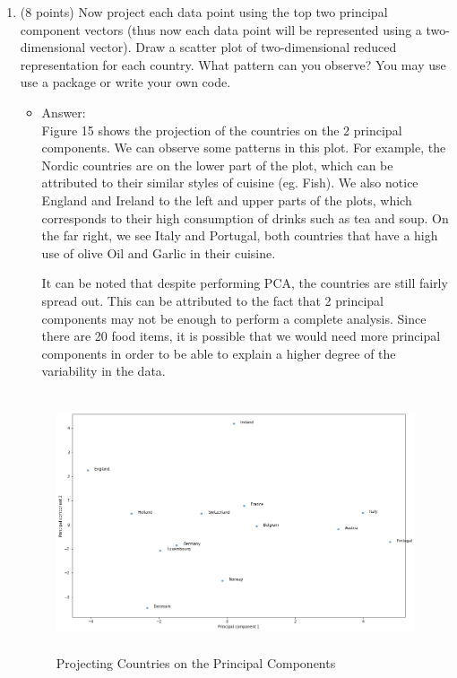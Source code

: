 \documentclass[twoside,10pt]{article}
\begin{document}
\begin{enumerate}
\item (8 points) Now project each data point using the top two principal component vectors (thus now each data point will be represented using a two-dimensional vector). Draw a scatter plot of two-dimensional reduced representation for each country. What pattern can you observe? You may use use a package or write your own code. 
\begin{itemize}
\item Answer:\\
Figure 15 shows the projection of the countries on the 2 principal components. We can observe some patterns in this plot. For example, the Nordic countries are on the lower part of the plot, which can be attributed to their similar styles of cuisine (eg. Fish). We also notice England and Ireland to the left and upper parts of the plots, which corresponds to their high consumption of drinks such as tea and soup. On the far right, we see Italy and Portugal, both countries that have a high use of olive Oil and Garlic in their cuisine.

It can be noted that despite performing PCA, the countries are still fairly spread out. This can be attributed to the fact that 2 principal components may not be enough to perform a complete analysis. Since there are 20 food items, it is possible that we would need more principal components in order to be able to explain a higher degree of the variability in the data.
\end{itemize}



\begin{figure}
  \centering
  \includegraphics[height=3in]{Images/PCAScatter.png}  
\caption{Projecting Countries on the Principal Components}
\end{figure}

\end{enumerate}
\end{document}
